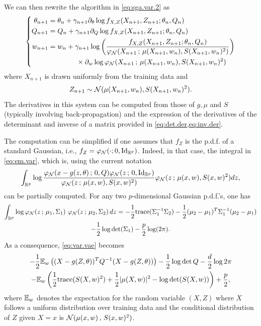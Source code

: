 We can then rewrite the algorithm in \cref{eq:sga.var.2} as
\begin{equation}
\label{eq:sga.vae}
\left\{
\begin{aligned}
\theta_{n+1} &= \theta_n +\gamma_{n+1} \partial_\theta \log f_{X,Z}(X_{n+1},Z_{n+1};\theta_n, Q_n)
\\
Q_{n+1} &= Q_n +\gamma_{n+1} \partial_Q \log f_{X,Z}(X_{n+1},Z_{n+1};\theta_n, Q_n)
\\
w_{n+1} &= w_n + \gamma_{n+1} \log \left( \frac{f_{X,Z}(X_{n+1},Z_{n+1};\theta_n, Q_n)}{\varphi_{\mathcal N}(X_{n+1}\,;\, \mu(X_{n+1}, w_n), S(X_{n+1}, w_n)^2)}\right) \\
& \qquad\qquad \times \partial_w \log \varphi_{\mathcal N}(X_{n+1}\,;\, \mu(X_{n+1}, w_n), S(X_{n+1}, w_n)^2)
\end{aligned}
\right.
\end{equation}
where $X_{n+1}$ is drawn uniformly from the training data and 
\[
Z_{n+1} \sim {\mathcal N}(\mu(X_{n+1}, w_n), S(X_{n+1}, w_n)^2).
\]
The derivatives in this system can be computed from those of $g, \mu$ and $S$ (typically involving back-propagation) and the  expression of the derivatives of the  determinant and inverse of a matrix provided in \cref{eq:det.der,eq:inv.der}. 

The computation can be simplified if one  assumes that $f_Z$ is the p.d.f. of a standard Gaussian, i.e., $f_Z = \phi_\CN(\cdot;0, \Id[p])$. Indeed, in that case, the integral in \cref{eq:em.var}, which is, using the current notation
\begin{equation}
\label{eq:var.vae}
\int_{\mR^p}\log \frac{\phi_\CN(x-g(z,\theta)\,;\, 0, Q)
\phi_\CN(z\,;\,0, \Id[p])}{\phi_\CN(z\,;\, \mu(x, w), S(x,w)^2)}
 \phi_\CN(z\,;\, \mu(x, w), S(x,w)^2) dz,
 \end{equation}
can be partially computed. For any two $p$-dimensional Gaussian p.d.f.'s, one has
\begin{multline}
\label{eq:gauss.kl}
\int_{{\mathbb{R}}^p} \log \varphi_{\mathcal N}(z\,;\,\mu_1, \Sigma_1)\ \varphi_{\mathcal N}(z\,;\,\mu_2, \Sigma_2)\, dz = -\frac12{\mathrm{trace}}(\Sigma_1^{-1} \Sigma_2) - \frac{1}{2} (\mu_2-\mu_1)^T \Sigma_1^{-1} (\mu_2-\mu_1)\\ - \frac12 \log \det(\Sigma_1) - \frac{p}{2} \log(2\pi).  
\end{multline}
As a consequence, \cref{eq:var.vae} becomes
\begin{multline}
\label{eq:var.vae.2}
-\frac{1}{2} \bm{\mathbb E}_w\left((X-g(Z, \theta))^T Q^{-1}(X-g(Z, \theta))\right) - \frac12 \log \det Q - \frac{d}2 \log 2\pi \\ - \bm{\mathbb E}_w\left(\frac12 {\mathrm{trace}}(S(X,w)^2) + \frac{1}{2} |\mu(X,w)|^2 - \log \det(S(X,w))\right) + \frac p2,
\end{multline}
where $\bm{\mathbb E}_w$ denotes the expectation for the random variable $(X,Z)$ where $X$ follows a uniform distribution over training data and the  conditional distribution of $Z$ given $X=x$ is ${\mathcal N}(\mu(x,w)\,,\,S(x,w)^2)$.

